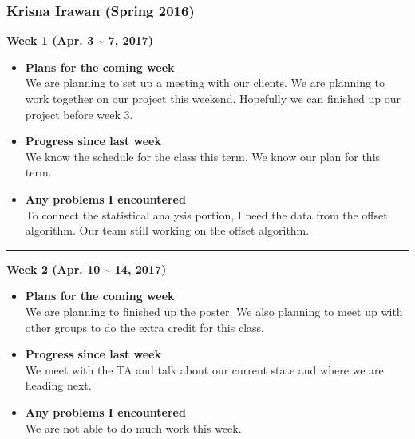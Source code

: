 	\subsubsection{Krisna Irawan (Spring 2016)}
	\vspace{0.5cm}

	\begin{center}
		\textbf{Week 1 (Apr. 3 {\textasciitilde{}} 7, 2017)}
	\end{center}
	\begin{itemize}
		\item \textbf{Plans for the coming week}
		\\We are planning to set up a meeting with our clients. We are planning to work together on our project this weekend. Hopefully we can finished up our project before week 3. \\

		\item \textbf{Progress since last week}
		\\We know the schedule for the class this term. We know our plan for this term. \\

		\item \textbf{Any problems I encountered}
		\\ To connect the statistical analysis portion, I need the data from the offset algorithm. Our team still working on the offset algorithm.\\
	\end{itemize}

	\rule{\textwidth}{0.5pt}

	\begin{center}
		\textbf{Week 2 (Apr. 10 {\textasciitilde{}} 14, 2017)}
	\end{center}
	\begin{itemize}
		\item \textbf{Plans for the coming week}
		\\We are planning to finished up the poster. We also planning to meet up with other groups to do the extra credit for this class. \\

		\item \textbf{Progress since last week}
		\\We meet with the TA and talk about our current state and where we are heading next. \\

		\item \textbf{Any problems I encountered}
		\\We are not able to do much work this week.\\
	\end{itemize}

